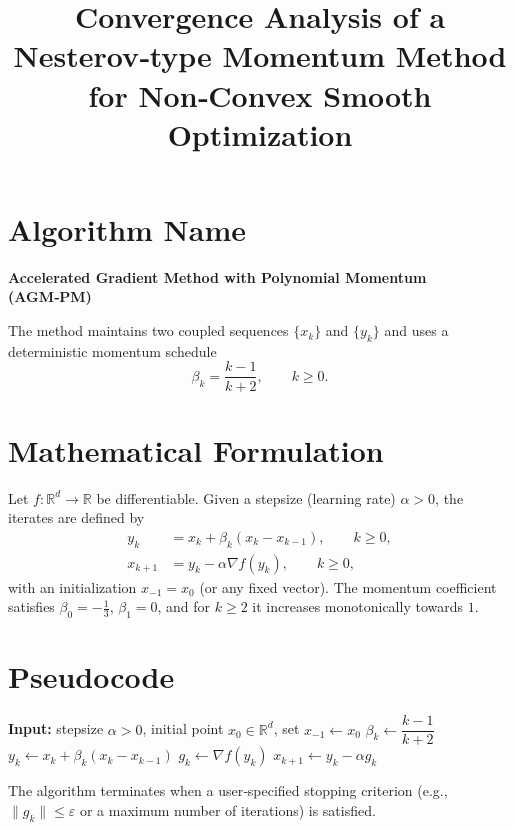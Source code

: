 \documentclass{article}
\begin{document}
\title{Convergence Analysis of a Nesterov‑type Momentum Method for Non‑Convex Smooth Optimization}
\author{}
\date{}
\maketitle

\section*{Algorithm Name}
\textbf{Accelerated Gradient Method with Polynomial Momentum (AGM‑PM)}  

The method maintains two coupled sequences $\{x_k\}$ and $\{y_k\}$ and uses a deterministic momentum schedule
\[
\beta_k=\frac{k-1}{k+2},\qquad k\ge 0 .
\]

\section*{Mathematical Formulation}
Let $f:\mathbb{R}^d\rightarrow\mathbb{R}$ be differentiable.  
Given a stepsize (learning rate) $\alpha>0$, the iterates are defined by
\begin{subequations}\label{eq:alg}
\begin{align}
y_k &= x_k + \beta_k (x_k-x_{k-1}), \qquad k\ge 0, \tag{1a}\\
x_{k+1} &= y_k - \alpha \nabla f(y_k), \qquad k\ge 0, \tag{1b}
\end{align}
\end{subequations}
with an initialization $x_{-1}=x_0$ (or any fixed vector).  
The momentum coefficient satisfies $\beta_0=-\tfrac13$, $\beta_1=0$, and for $k\ge 2$ it increases monotonically towards $1$.

\section*{Pseudocode}
\begin{algorithm}[H]
\caption{AGM‑PM}
\begin{algorithmic}[1]
\STATE \textbf{Input:} stepsize $\alpha>0$, initial point $x_0\in\mathbb{R}^d$, set $x_{-1}\gets x_0$
    \STATE $\beta_k \gets \dfrac{k-1}{k+2}$ 
    \STATE $y_k \gets x_k + \beta_k (x_k-x_{k-1})$ \label{line:y}
    \STATE $g_k \gets \nabla f(y_k)$
    \STATE $x_{k+1} \gets y_k - \alpha g_k$
\ENDFOR
\end{algorithmic}
\end{algorithm}
The algorithm terminates when a user‑specified stopping criterion (e.g., $\|g_k\|\le\varepsilon$ or a maximum number of iterations) is satisfied.
\end{document}

